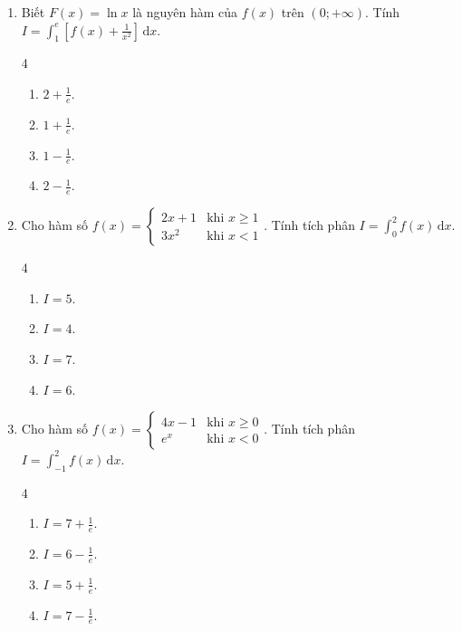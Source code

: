 \documentclass[12pt]{article}
\begin{document}
\begin{enumerate}[label=\textbf{Câu \arabic*.}]
		\item Biết $F(x) = \ln x$ là nguyên hàm của $f(x)$ trên $(0; +\infty)$. Tính $I = \displaystyle \int_{1}^{e} \left[f(x) + \frac{1}{x^2}\right]\,\mathrm{d}x$.
		\begin{multicols}{4}
			\begin{enumerate}[label=\textbf{\Alph*.}]
				\item $2 + \frac{1}{e}$.
				\item $1 + \frac{1}{e}$.
				\item $1 - \frac{1}{e}$.
				\item $2 - \frac{1}{e}$.
			\end{enumerate}
		\end{multicols}
		
		\item Cho hàm số $f(x) = \begin{cases} 2x + 1 & \text{khi } x \ge 1 \\ 3x^2 & \text{khi } x < 1 \end{cases}$. Tính tích phân $I = \displaystyle \int_{0}^{2} f(x)\,\mathrm{d}x$.
		\begin{multicols}{4}
			\begin{enumerate}[label=\textbf{\Alph*.}]
				\item $I = 5$.
				\item $I = 4$.
				\item $I = 7$.
				\item $I = 6$.
			\end{enumerate}
		\end{multicols}
		
		\item Cho hàm số $f(x) = \begin{cases} 4x - 1 & \text{khi } x \ge 0 \\ e^x & \text{khi } x < 0 \end{cases}$. Tính tích phân $I = \displaystyle \int_{-1}^{2} f(x)\,\mathrm{d}x$.
		\begin{multicols}{4}
			\begin{enumerate}[label=\textbf{\Alph*.}]
				\item $I = 7 + \frac{1}{e}$.
				\item $I = 6 - \frac{1}{e}$.
				\item $I = 5 + \frac{1}{e}$.
				\item $I = 7 - \frac{1}{e}$.
			\end{enumerate}
		\end{multicols}
		

\end{enumerate}
\end{document}
